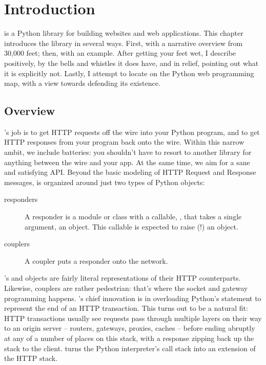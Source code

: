 \chapter{Introduction \label{introduction}}

 is a Python library for building websites and web applications.
This chapter introduces the library in several ways. First, with a narrative
overview from 30,000 feet; then, with an example. After getting your feet wet, I
describe  positively, by the bells and whistles it does have, and
in relief, pointing out what it is explicitly not. Lastly, I attempt to locate
 on the Python web programming map, with a view towards defending
its existence.


\section{Overview \label{overview}}

's job is to get HTTP requests off the wire into your Python
program, and to get HTTP responses from your program back onto the wire. Within
this narrow ambit, we include batteries: you shouldn't have to resort to another
library for anything between the wire and your app. At the same time, we aim for
a sane and satisfying API. Beyond the basic modeling of HTTP Request and
Response messages,  is organized around just two types of Python
objects:

\begin{description}

\item[responders]
    {A responder is a module or class with a callable, , that
    takes a single argument, an  object. This callable is
    expected to raise (!) an  object.}

\item[couplers]
    {A coupler puts a responder onto the network.}

\end{description}

's  and  objects are fairly literal
representations of their HTTP counterparts. Likewise, couplers are rather
pedestrian: that's where the socket and gateway programming happens.
's chief innovation is in overloading Python's 
statement to represent the end of an HTTP transaction. This turns out to be a
natural fit: HTTP transactions usually see requests pass through multiple layers
on their way to an origin server -- routers, gateways, proxies, caches -- before
ending abruptly at any of a number of places on this stack, with a response
zipping back up the stack to the client.  turns the Python
interpreter's call stack into an extension of the HTTP stack.



